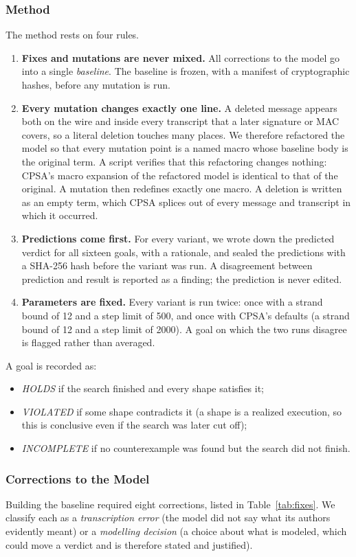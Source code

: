 \documentclass[11pt]{article}
\begin{document}
\subsubsection{Method}
The method rests on four rules.
\begin{enumerate}
    \item \textbf{Fixes and mutations are never mixed.} All corrections to the model go into a single \textit{baseline}. The baseline is frozen, with a manifest of cryptographic hashes, before any mutation is run.
    \item \textbf{Every mutation changes exactly one line.} A deleted message appears both on the wire and inside every transcript that a later signature or MAC covers, so a literal deletion touches many places. We therefore refactored the model so that every mutation point is a named macro whose baseline body is the original term. A script verifies that this refactoring changes nothing: CPSA's macro expansion of the refactored model is identical to that of the original. A mutation then redefines exactly one macro. A deletion is written as an empty term, which CPSA splices out of every message and transcript in which it occurred.
    \item \textbf{Predictions come first.} For every variant, we wrote down the predicted verdict for all sixteen goals, with a rationale, and sealed the predictions with a SHA-256 hash before the variant was run. A disagreement between prediction and result is reported as a finding; the prediction is never edited.
    \item \textbf{Parameters are fixed.} Every variant is run twice: once with a strand bound of 12 and a step limit of 500, and once with CPSA's defaults (a strand bound of 12 and a step limit of 2000). A goal on which the two runs disagree is flagged rather than averaged.
\end{enumerate}

A goal is recorded as:
\begin{itemize}
    \item \textit{HOLDS} if the search finished and every shape satisfies it;
    \item \textit{VIOLATED} if some shape contradicts it (a shape is a realized execution, so this is conclusive even if the search was later cut off);
    \item \textit{INCOMPLETE} if no counterexample was found but the search did not finish.
\end{itemize}

\subsubsection{Corrections to the Model}
Building the baseline required eight corrections, listed in Table~\ref{tab:fixes}. We classify each as a \textit{transcription error} (the model did not say what its authors evidently meant) or a \textit{modelling decision} (a choice about what is modeled, which could move a verdict and is therefore stated and justified).
\end{document}
